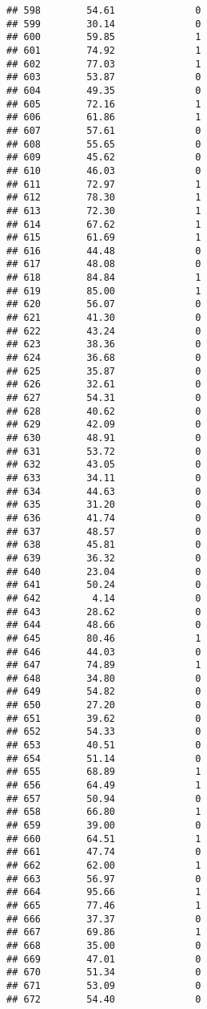 \documentclass[
]{article}
\begin{document}
\begin{verbatim}
## 598        54.61              0
## 599        30.14              0
## 600        59.85              1
## 601        74.92              1
## 602        77.03              1
## 603        53.87              0
## 604        49.35              0
## 605        72.16              1
## 606        61.86              1
## 607        57.61              0
## 608        55.65              0
## 609        45.62              0
## 610        46.03              0
## 611        72.97              1
## 612        78.30              1
## 613        72.30              1
## 614        67.62              1
## 615        61.69              1
## 616        44.48              0
## 617        48.08              0
## 618        84.84              1
## 619        85.00              1
## 620        56.07              0
## 621        41.30              0
## 622        43.24              0
## 623        38.36              0
## 624        36.68              0
## 625        35.87              0
## 626        32.61              0
## 627        54.31              0
## 628        40.62              0
## 629        42.09              0
## 630        48.91              0
## 631        53.72              0
## 632        43.05              0
## 633        34.11              0
## 634        44.63              0
## 635        31.20              0
## 636        41.74              0
## 637        48.57              0
## 638        45.81              0
## 639        36.32              0
## 640        23.04              0
## 641        50.24              0
## 642         4.14              0
## 643        28.62              0
## 644        48.66              0
## 645        80.46              1
## 646        44.03              0
## 647        74.89              1
## 648        34.80              0
## 649        54.82              0
## 650        27.20              0
## 651        39.62              0
## 652        54.33              0
## 653        40.51              0
## 654        51.14              0
## 655        68.89              1
## 656        64.49              1
## 657        50.94              0
## 658        66.80              1
## 659        39.00              0
## 660        64.51              1
## 661        47.74              0
## 662        62.00              1
## 663        56.97              0
## 664        95.66              1
## 665        77.46              1
## 666        37.37              0
## 667        69.86              1
## 668        35.00              0
## 669        47.01              0
## 670        51.34              0
## 671        53.09              0
## 672        54.40              0

\end{verbatim}
\end{document}
